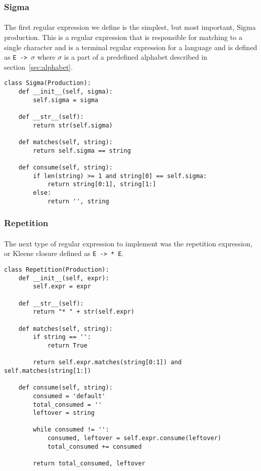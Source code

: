 \documentclass{article}
\begin{document}
\subsubsection{Sigma}
\label{sec:algos:regex:sigma}
\paragraph{} The first regular expression we define is the simplest, 
but most important, Sigma production. This is a regular expression
that is responsible for matching to a single character and is a terminal 
regular expression for a language and is defined as \verb|E -> |$\sigma$ where $\sigma$ is a part of a predefined alphabet described in section~\ref{sec:alphabet}. 
\begin{verbatim}
class Sigma(Production):
    def __init__(self, sigma):
        self.sigma = sigma

    def __str__(self):
        return str(self.sigma)

    def matches(self, string):
        return self.sigma == string

    def consume(self, string):
        if len(string) >= 1 and string[0] == self.sigma:
            return string[0:1], string[1:]
        else:
            return '', string
\end{verbatim}

\subsubsection{Repetition}
\label{sec:algos:regex:rep}
\paragraph{} The next type of regular expression to implement was the 
repetition expression, or Kleene closure defined as \verb|E -> * E|. 

\begin{verbatim}
class Repetition(Production):
    def __init__(self, expr):
        self.expr = expr
    
    def __str__(self):
        return "* " + str(self.expr)

    def matches(self, string):
        if string == '':
            return True

        return self.expr.matches(string[0:1]) and self.matches(string[1:])
        
    def consume(self, string):
        consumed = 'default'
        total_consumed = ''
        leftover = string

        while consumed != '':
            consumed, leftover = self.expr.consume(leftover)
            total_consumed += consumed

        return total_consumed, leftover
\end{verbatim}
\end{document}
